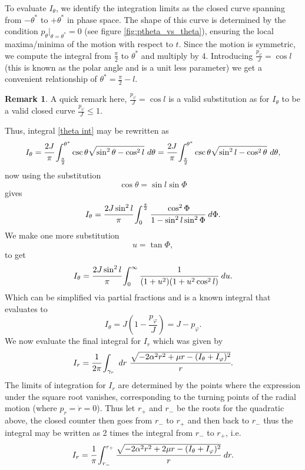 \documentclass[12pt,oneside]{report}
\theoremstyle{definition}
\newtheorem{remark}{Remark}
\begin{document}
To evaluate $I_{\theta}$, we identify the integration limits as the closed curve spanning from $-\theta^{*}$ to $+\theta^{*}$ in phase space. The shape of this curve is determined by the condition $p_{\theta}|_{\theta = \theta^{*}} = 0$ (see figure  \ref{fig:ptheta_vs_theta}), ensuring  the local maxima/minima of the motion with respect to $t$. Since the motion is symmetric, we compute the integral from $\frac{\pi}{2}$ to $\theta^{*}$ and multiply by 4. Introducing
$\frac{p_{\varphi}}{J} = \cos{l}$ (this is known as the polar angle \cite{goldstein2002classical} and is a unit less parameter)  we get a convenient relationship of $\theta^{*} = \frac{\pi}{2} -l $. 
\begin{remark}
   A quick remark here, $\frac{p_{\varphi}}{J} = \cos{l}$ is a valid substitution as for $I_{\theta}$ to be a valid closed curve $\frac{p_{\varphi}}{J} \leq 1$.
\end{remark}
\noindent Thus, integral \ref{theta int} may be rewritten as
$$I_{\theta} = \cfrac{2J}{\pi} \int_{\frac{\pi}{2}}^{\theta^{*}}  \csc{\theta} \sqrt{\sin^{2}{\theta} - \cos^{2}{l}} \ d \theta  = \cfrac{2J}{\pi} \int_{\frac{\pi}{2}}^{\theta^{*}}  \csc{\theta} \sqrt{\sin^{2}{l} - \cos^{2}{\theta}} \ d \theta , $$
now using the substitution
$$ \cos{\theta} = \sin{l}\sin{\Phi}$$
gives
$$ I_{\theta} = \cfrac{2J\sin^{2}{l}}{\pi} \int_{0}^{\frac{\pi}{2}} \cfrac{\cos^{2}{\Phi}}{1-\sin^{2}{l}\sin^{2}{\Phi}} \ d \Phi. $$
We make one more substitution
$$ u = \tan{\Phi},$$
to get
$$I_{\theta} = \cfrac{2J\sin^{2}{l}}{\pi} \int_{0}^{\infty} \cfrac{1}{(1+u^{2})(1+u^{2}\cos^{2}{l})} \ du.$$
Which can be simplified via partial fractions and is a known integral that evaluates to
\begin{equation}
    I_{\theta} = J \left(1-\frac{p_{\varphi}}{J} \right) = J - p_{\varphi}.
\end{equation}
We now evaluate the final integral for $I_{r}$ which was given by
$$ I_{r} = \cfrac{1}{2 \pi} \int_{\gamma_{r}} \ d r \ \cfrac{\sqrt{-2\alpha^{2}r^{2}+\mu r - (I_{\theta}+I_{\varphi})^{2}}}{r} .$$
The limits of integration for $I_{r}$ are determined by the points where the expression under the square root vanishes, corresponding to the turning points of the radial motion (where $p_{r}=\dot{r} = 0$). Thus let $r_{+}$ and $r_{-}$ be the roots for the quadratic above, the closed counter then goes from $r_{-}$ to $r_{+}$ and then back to $r_{-}$ thus the integral may be written as 2 times the integral from $r_{-}$ to $r_{+}$,  i.e.
$$ I_{r} = \cfrac{1}{\pi} \int_{r_{-}}^{r_{+}} \cfrac{\sqrt{-2\alpha^{2}r^{2}+2 \mu r -(I_{\theta}+I_{\varphi})^{2}}}{r} \ dr.$$
\end{document}
